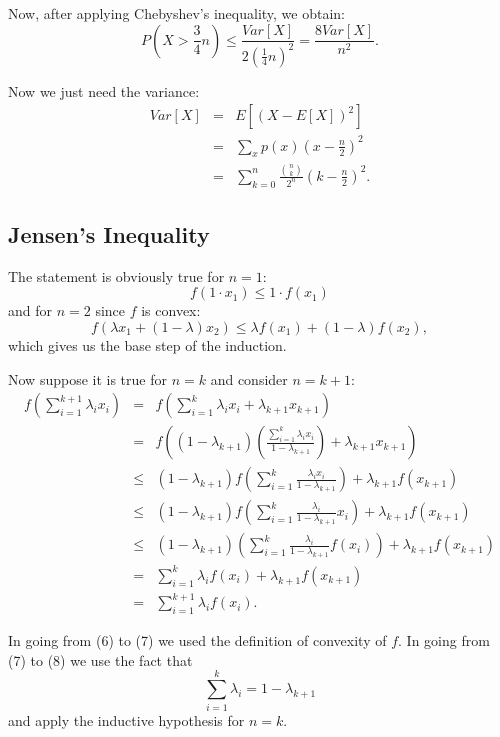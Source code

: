 Now, after applying Chebyshev's inequality, we obtain:
\[
  P\left( X > \frac{3}{4}n \right) 
    \leq \frac{Var[X]}{2 \left(\frac{1}{4}n\right)^2}
    = \frac{8Var[X]}{n^2}.
\]

Now we just need the variance:
\begin{eqnarray*}
  Var[X] & = & E[(X-E[X])^2] \\
         & = & \sum_xp(x)\left(x-\frac{n}{2}\right)^2 \\
         & = & \sum_{k=0}^n\frac{\binom{n}{k}}{2^n}\left(k-\frac{n}{2}\right)^2.
\end{eqnarray*}


\subsection{Jensen's Inequality}
The statement is obviously true for $n=1$: 
$$ f(1\cdot x_1) \leq 1\cdot f(x_1)$$ and for $n=2$ since $f$ is convex:
$$ f(\lambda x_1 + (1-\lambda)x_2) \leq \lambda f(x_1) + (1-\lambda)f(x_2),$$
which gives us the base step of the induction.

Now suppose it is true for $n=k$ and consider $n=k+1$:
\begin{eqnarray}
  f\left(\sum_{i=1}^{k+1}\lambda_ix_i\right) 
    &=& f\left(\sum_{i=1}^{k}\lambda_ix_i+\lambda_{k+1}x_{k+1}\right) \\
    &=& f\left((1-\lambda_{k+1})\left(\frac{\sum_{i=1}^{k}\lambda_ix_i}{1-\lambda_{k+1}}\right)+\lambda_{k+1}x_{k+1}\right) \\
    &\leq& (1-\lambda_{k+1})f\left(\sum_{i=1}^k\frac{\lambda_ix_i}{1-\lambda_{k+1}}\right) + \lambda_{k+1}f(x_{k+1}) \\
    &\leq& (1-\lambda_{k+1})f\left(\sum_{i=1}^k\frac{\lambda_i}{1-\lambda_{k+1}}x_i\right) + \lambda_{k+1}f(x_{k+1}) \\
    &\leq& (1-\lambda_{k+1})\left(\sum_{i=1}^k\frac{\lambda_i}{1-\lambda_{k+1}}f(x_i)\right) + \lambda_{k+1}f(x_{k+1}) \\
    &=& \sum_{i=1}^k\lambda_if(x_i) + \lambda_{k+1}f(x_{k+1}) \\
    &=& \sum_{i=1}^{k+1}\lambda_if(x_i).
\end{eqnarray}

In going from (6) to (7) we used the definition of convexity of $f$. 
In going from (7) to (8) we use the fact that 
$$ \sum_{i=1}^k\lambda_i = 1 - \lambda_{k+1}$$ and apply the inductive 
hypothesis for $n=k$.
